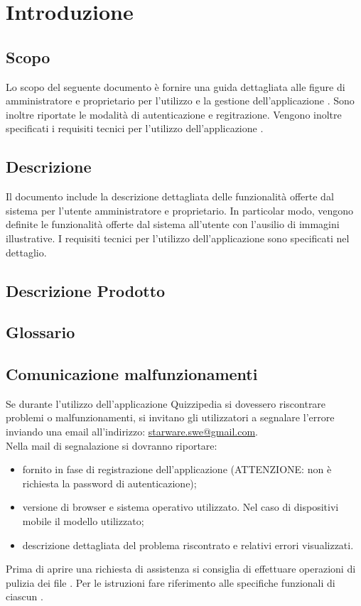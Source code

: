 \documentclass[12pt,a4paper]{article}
\begin{document}
	\newpage
	\tableofcontents
	\newpage
	\listoftables
	\listoffigures
	\newpage
	
	
	\section{Introduzione}	\label{intro}
	
	\subsection{Scopo}
	Lo scopo del seguente documento è fornire una guida dettagliata alle figure di amministratore e proprietario per l’utilizzo e la gestione dell’applicazione \prj{}. Sono inoltre riportate le modalità di autenticazione e regitrazione. 
	Vengono inoltre specificati i requisiti tecnici per l'utilizzo dell'applicazione \prj{}.

	\subsection{Descrizione}
    Il documento include la descrizione dettagliata delle funzionalità offerte dal sistema per l'utente amministratore e proprietario. In particolar modo, vengono definite le funzionalità offerte dal sistema all’utente con l’ausilio di immagini illustrative. 
    I requisiti tecnici per l'utilizzo dell'applicazione \prj{} sono specificati nel dettaglio.
	
	\subsection{Descrizione Prodotto}
	\descrizioneProdotto
	
	\subsection{Glossario}
	\glossarioManualiPrint
	
	\subsection{Comunicazione malfunzionamenti}
	Se durante l’utilizzo dell’applicazione Quizzipedia si dovessero riscontrare problemi o 	malfunzionamenti, si invitano gli utilizzatori a segnalare l’errore inviando una email all’indirizzo:
	\url{starware.swe@gmail.com}. \\
	Nella mail di segnalazione si dovranno riportare:
	\begin{itemize}
		\item {} fornito in fase di registrazione dell’applicazione (ATTENZIONE: non è richiesta la password di autenticazione);
		\item versione di browser e sistema operativo utilizzato. Nel caso di dispositivi mobile il modello utilizzato;
		\item descrizione dettagliata del problema riscontrato e relativi errori visualizzati.
	\end{itemize}
	Prima di aprire una richiesta di assistenza si consiglia di effettuare operazioni di pulizia dei file . Per le istruzioni fare riferimento alle specifiche funzionali di ciascun .
	
\end{document}
